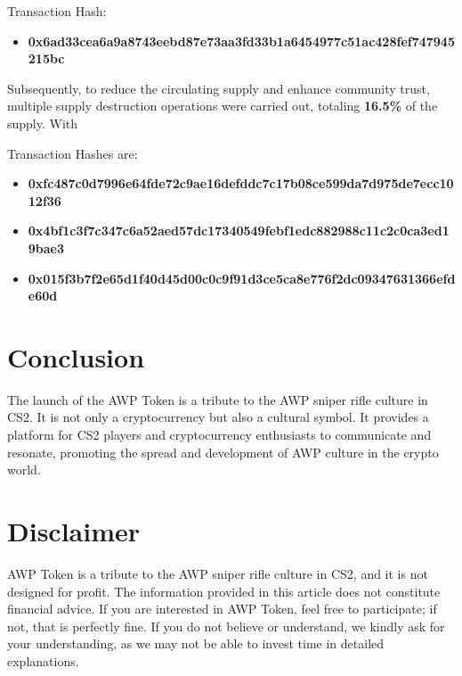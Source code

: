 \documentclass[journal,onecolumn,]{IEEEtran}
\begin{document}
	Transaction Hash:
	
		\begin{itemize}
		\item 	\textbf{0x6ad33cea6a9a8743eebd87e73aa3fd33b1a6454977c51ac428fef747945215bc}
	\end{itemize}



	Subsequently, to reduce the circulating supply and enhance community trust, multiple supply destruction operations were carried out, totaling \textbf{16.5\%} of the supply. With
	
	Transaction Hashes are:
	
	\begin{itemize}
		\item \textbf{0xfc487c0d7996e64fde72c9ae16defddc7c17b08ce599da7d975de7ecc1012f36}
		\item \textbf{0x4bf1c3f7c347c6a52aed57dc17340549febf1edc882988c11c2c0ca3ed19bae3}
		\item \textbf{0x015f3b7f2e65d1f40d45d00c0c9f91d3ce5ca8e776f2dc09347631366efde60d}
	\end{itemize}
	
	\section{Conclusion}
	The launch of the AWP Token is a tribute to the AWP sniper rifle culture in CS2. It is not only a cryptocurrency but also a cultural symbol. It provides a platform for CS2 players and cryptocurrency enthusiasts to communicate and resonate, promoting the spread and development of AWP culture in the crypto world.
	
	
	\section*{Disclaimer}

			AWP Token is a tribute to the AWP sniper rifle culture in CS2, and it is not designed for profit. The information provided in this article does not constitute financial advice. If you are interested in AWP Token, feel free to participate; if not, that is perfectly fine. If you do not believe or understand, we kindly ask for your understanding, as we may not be able to invest time in detailed explanations.
		
		
	\vfill
	
	 
	


	
	\vfill
		
\end{document}
